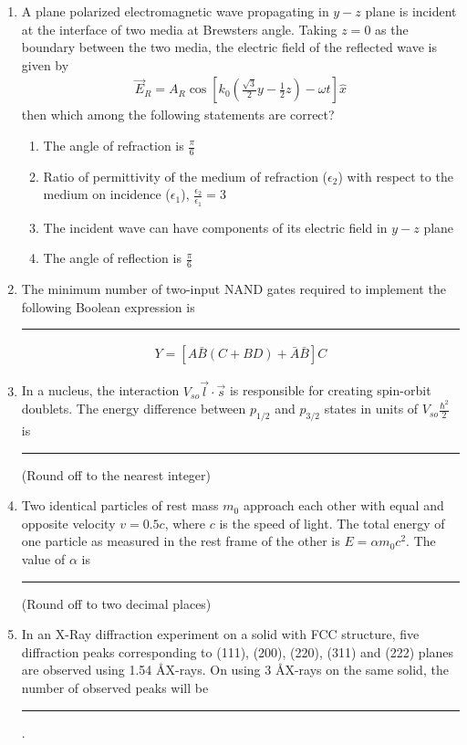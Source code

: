 \documentclass[journal,12pt,onecolumn]{IEEEtran}
\theoremstyle{remark}
\begin{document}
\begin{enumerate}
\item
A plane polarized electromagnetic wave propagating in $y-z$ plane is incident at the interface of two media at Brewster\textquotesingle s angle. Taking $z = 0$ as the boundary between the two media, the electric field of the reflected wave is given by \begin{align*}\vec{E}_R = A_R \cos \left[ k_0 \left( \frac{\sqrt{3}}{2}y - \frac{1}{2}z \right) - \omega t \right] \hat{x}\end{align*} then which among the following statements are correct?
\begin{enumerate}
    \item The angle of refraction is $\frac{\pi}{6}$
    \item Ratio of permittivity of the medium of refraction ($\epsilon_2$) with respect to the medium on incidence ($\epsilon_1$), $\frac{\epsilon_2}{\epsilon_1} = 3$
    \item The incident wave can have components of its electric field in $y-z$ plane
    \item The angle of reflection is $\frac{\pi}{6}$
\end{enumerate}


\item
The minimum number of two-input NAND gates required to implement the following Boolean expression is \rule{1cm}{0.4pt}
\begin{align*}Y = [A\bar{B}(C + BD) + \bar{A}\bar{B}]C\end{align*}


\item
In a nucleus, the interaction $V_{so}\vec{l} \cdot \vec{s}$ is responsible for creating spin-orbit doublets. The energy difference between $p_{1/2}$ and $p_{3/2}$ states in units of $V_{so}\frac{\hbar^2}{2}$ is \rule{1cm}{0.4pt} (Round off to the nearest integer)


\item
Two identical particles of rest mass $m_0$ approach each other with equal and opposite velocity $v = 0.5c$, where $c$ is the speed of light. The total energy of one particle as measured in the rest frame of the other is $E = \alpha m_0 c^2$. The value of $\alpha$ is \rule{1cm}{0.4pt} (Round off to two decimal places)


\item
In an X-Ray diffraction experiment on a solid with FCC structure, five diffraction peaks corresponding to (111), (200), (220), (311) and (222) planes are observed using 1.54 \AA X-rays. On using 3 \AA X-rays on the same solid, the number of observed peaks will be \rule{1cm}{0.4pt}.


\end{enumerate}
\end{document}
